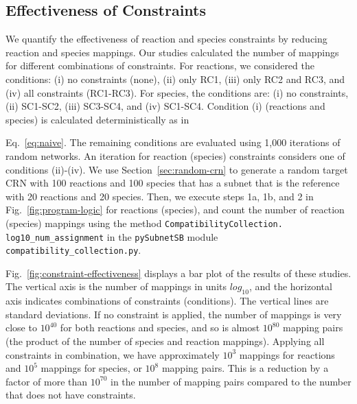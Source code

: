 \documentclass[webpdf,contemporary,large]{oup-authoring-template}
\newcommand{\eqnref}[1]{
  Eq.~\ref{#1}}
\newcommand{\fig}[1]{
  Fig.~\ref{#1}}
\newcommand{\secref}[1]{Section~\ref{#1}}
\newcommand{\py}{\texttt{pySubnetSB}}
\theoremstyle{thmstyleone}%
\theoremstyle{thmstyletwo}%
\theoremstyle{thmstylethree}%
\begin{document}
\subsection{Effectiveness of Constraints}\label{sec:effectivness-of-constraints}
We quantify the effectiveness of reaction and species constraints by reducing reaction and species mappings.
Our studies calculated the number of mappings for different combinations of constraints.
For reactions, we considered the conditions: (i) no constraints (none),
(ii) only RC1, (iii) only RC2 and RC3, and (iv) all constraints (RC1-RC3).
For species, the conditions are: (i) no constraints, (ii) SC1-SC2,
(iii) SC3-SC4, and (iv) SC1-SC4.
Condition (i) (reactions and species) is calculated deterministically as in
\eqnref{eq:naive}.
The remaining conditions are evaluated using 1,000 iterations
of random networks.
An iteration for reaction (species) constraints considers one of conditions
(ii)-(iv).
We use \secref{sec:random-crn} to generate a random target CRN with 100 reactions and 100 species that has a subnet that is the reference with 20 reactions and 20 species.
Then, we execute steps 1a, 1b, and 2 in \fig{fig:program-logic} for reactions (species), and count the number of reaction (species) mappings using the method
\texttt{CompatibilityCollection.}
\linebreak
\texttt{log10\_num\_assignment}
in the \py{} module
\linebreak
\texttt{compatibility\_collection.py}.

\fig{fig:constraint-effectiveness} displays a bar plot of the results of these studies.
The vertical axis is the number of mappings in units $log_{10}$, and
the horizontal axis indicates combinations of constraints (conditions).
The vertical lines are standard deviations.
If no constraint is applied, the number of mappings is very close to $10^{40}$ for both reactions and species, and so
is almost $10^{80}$ mapping pairs (the product of the number of species and reaction mappings).
Applying all constraints in combination, we have approximately $10^3$ mappings for reactions and $10^5$ mappings for species, or $10^8$ mapping pairs.
This is a reduction by a factor of more than $10^{70}$ in the number of mapping pairs compared to the number that does not have constraints.
\end{document}
